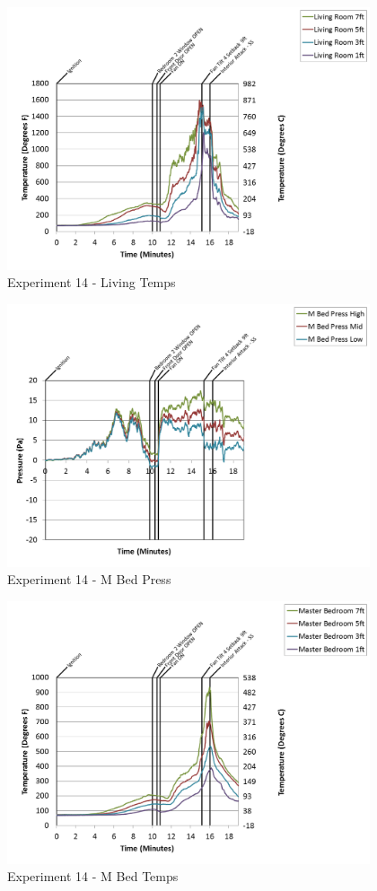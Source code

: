 \documentclass{article}
\begin{document}
\begin{appendices}
\begin{figure}[h!]
	\centering
	\includegraphics[height=3.05in]{0_Images/Results_Charts/Exp_14_Charts/LivingTemps.png}
	\caption{Experiment 14 - Living Temps}
\end{figure}

\clearpage

\begin{figure}[h!]
	\centering
	\includegraphics[height=3.05in]{0_Images/Results_Charts/Exp_14_Charts/MBedPress.png}
	\caption{Experiment 14 - M Bed Press}
\end{figure}


\begin{figure}[h!]
	\centering
	\includegraphics[height=3.05in]{0_Images/Results_Charts/Exp_14_Charts/MBedTemps.png}
	\caption{Experiment 14 - M Bed Temps}
\end{figure}


\end{appendices}
\end{document}
